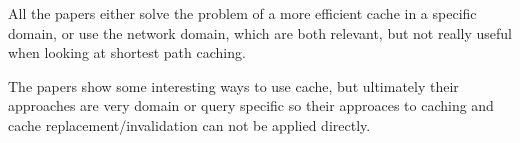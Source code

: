 All the papers either solve the problem of a more efficient cache in a specific domain, or use the network domain,  which are both relevant, but not really useful when looking at shortest path caching.

The papers show some interesting ways to use cache, but ultimately their approaches are very domain or query specific so their approaces to caching and cache replacement/invalidation can not be applied directly.


